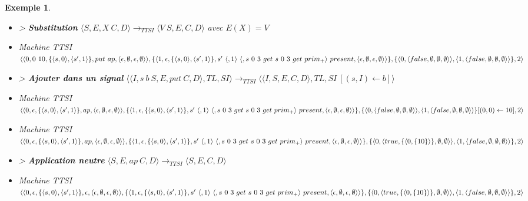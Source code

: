 \documentclass[10pt,a4paper]{report}
\newtheorem{ex}{Exemple}
\begin{document}
\begin{ex}
\begin{itemize}
			\item[] > \textbf{Substitution} $\langle S,E,X~C,D\rangle
			\longrightarrow_{TTSI} 
			\langle V~S,E,C,D\rangle$ avec $E(X) = V$
			\item[] Machine TTSI $\langle\langle 0,0~10,\{\langle s,0\rangle,\langle s',1\rangle\},put~ap,\langle\epsilon,\emptyset,\epsilon,\emptyset\rangle\rangle,\{\langle 1,\epsilon,\{\langle s,0\rangle,\langle s',1\rangle\}, s'~\langle,1\rangle~\langle,s~0~3~get~s~0~3~get~prim_{+}\rangle~present ,\\\langle\epsilon,\emptyset,\epsilon,\emptyset\rangle\rangle\},\{\langle 0,\langle false,\emptyset,\emptyset,\emptyset\rangle\rangle,\langle 1,\langle false,\emptyset,\emptyset,\emptyset\rangle\rangle\},2\rangle$
			\item[] > \textbf{Ajouter dans un signal} $\langle\langle I,s~b~S,E,put~C,D\rangle,TL,SI\rangle
			\longrightarrow_{TTSI} 
			\langle\langle I,S,E,C,D\rangle,TL,SI~[(s,I) \leftarrow b]\rangle$ 
			\item[] Machine TTSI $\langle\langle 0,\epsilon,\{\langle s,0\rangle,\langle s',1\rangle\},ap,\langle\epsilon,\emptyset,\epsilon,\emptyset\rangle\rangle,\{\langle 1,\epsilon,\{\langle s,0\rangle,\langle s',1\rangle\}, s'~\langle,1\rangle~\langle,s~0~3~get~s~0~3~get~prim_{+}\rangle~present ,\\\langle\epsilon,\emptyset,\epsilon,\emptyset\rangle\rangle\},\{\langle 0,\langle false,\emptyset,\emptyset,\emptyset\rangle\rangle,\langle 1,\langle false,\emptyset,\emptyset,\emptyset\rangle\rangle\}[(0,0) \leftarrow 10],2\rangle$
			\item[] Machine TTSI $\langle\langle 0,\epsilon,\{\langle s,0\rangle,\langle s',1\rangle\},ap,\langle\epsilon,\emptyset,\epsilon,\emptyset\rangle\rangle,\{\langle 1,\epsilon,\{\langle s,0\rangle,\langle s',1\rangle\}, s'~\langle,1\rangle~\langle,s~0~3~get~s~0~3~get~prim_{+}\rangle~present ,\\\langle\epsilon,\emptyset,\epsilon,\emptyset\rangle\rangle\},\{\langle 0,\langle true,\{\langle 0,\{10\}\rangle\},\emptyset,\emptyset\rangle\rangle,\langle 1,\langle false,\emptyset,\emptyset,\emptyset\rangle\rangle\},2\rangle$
			\item[] > \textbf{Application neutre} $\langle S,E,ap~C,D\rangle
			\longrightarrow_{TTSI} 
			\langle S,E,C,D\rangle$
			\item[] Machine TTSI $\langle\langle 0,\epsilon,\{\langle s,0\rangle,\langle s',1\rangle\},\epsilon,\langle\epsilon,\emptyset,\epsilon,\emptyset\rangle\rangle,\{\langle 1,\epsilon,\{\langle s,0\rangle,\langle s',1\rangle\}, s'~\langle,1\rangle~\langle,s~0~3~get~s~0~3~get~prim_{+}\rangle~present ,\\\langle\epsilon,\emptyset,\epsilon,\emptyset\rangle\rangle\},\{\langle 0,\langle true,\{\langle 0,\{10\}\rangle\},\emptyset,\emptyset\rangle\rangle,\langle 1,\langle false,\emptyset,\emptyset,\emptyset\rangle\rangle\},2\rangle$

\end{itemize}
\end{ex}
\end{document}

